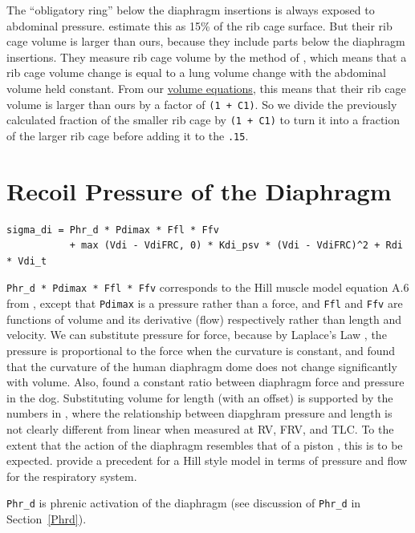 \documentclass[12pt,openany,oneside]{book}
\begin{document}
\label{rib cage volume}
The ``obligatory ring'' below the diaphragm insertions is always
exposed to abdominal pressure.  \citet{Mead01091982} estimate this as
15\% of the rib cage surface.  But their rib cage volume is larger
than ours, because they include parts below the diaphragm insertions.
They measure rib cage volume by the method of \citet{Konno1967}, which
means that a rib cage volume change is equal to a lung volume change
with the abdominal volume held constant.  From our \hyperref[The
Volume Equations]{volume equations}, this means that their rib cage
volume is larger than ours by a factor of \verb~(1 + C1)~.  So we
divide the previously calculated fraction of the smaller rib cage by
\verb~(1 + C1)~ to turn it into a fraction of the larger rib cage
before adding it to the \verb~.15~.

\filbreak
\section{Recoil Pressure of the Diaphragm}

\begin{verbatim}
sigma_di = Phr_d * Pdimax * Ffl * Ffv
           + max (Vdi - VdiFRC, 0) * Kdi_psv * (Vdi - VdiFRC)^2 + Rdi * Vdi_t
\end{verbatim}

\verb~Phr_d * Pdimax * Ffl * Ffv~ corresponds to the Hill muscle model
equation A.6 from \citet{Ratnovsky20031771}, except that \verb~Pdimax~
is a pressure rather than a force, and \verb~Ffl~ and \verb~Ffv~ are
functions of volume and its derivative (flow) respectively rather than
length and velocity.  We can substitute pressure for force, because by
Laplace's Law \citep{laplace1808traite}, the pressure is proportional
to the force when the curvature is constant, and \citet{Braun01081982}
found that the curvature of the human diaphragm dome does not change
significantly with volume.  Also, \citet{Kim01091976} found a constant
ratio between diaphragm force and pressure in the dog.  Substituting
volume for length (with an offset) is supported by the numbers in
\citet{Cluzel01052000}, where the relationship between diapghram
pressure and length is not clearly different from linear when measured
at RV, FRV, and TLC.  To the extent that the action of the diaphragm
resembles that of a piston \citep{Kim01091976}, this is to be
expected.  \citet{Younes01101981} provide a precedent for a Hill style
model in terms of pressure and flow for the respiratory system.

\verb~Phr_d~ is phrenic activation of the diaphragm (see discussion of
\verb~Phr_d~ in Section~\ref{Phrd}).
\end{document}
